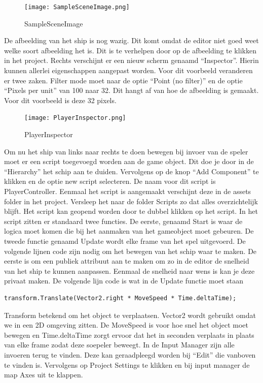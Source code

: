 \begin{figure}[H]
    \centering
    \texttt{[image: SampleSceneImage.png]}
    \caption{SampleSceneImage}
    \label{fig:SampleSceneImage}
\end{figure}

De afbeelding van het ship is nog wazig. Dit komt omdat de editor niet goed weet welke soort afbeelding het is. Dit is te verhelpen door op de afbeelding te klikken in het project. Rechts verschijnt er een nieuw scherm genaamd “Inspector”. Hierin kunnen allerlei eigenschappen aangepast worden. Voor dit voorbeeld veranderen er twee zaken. Filter mode moet naar de optie “Point (no filter)” en de optie “Pixels per unit” van 100 naar 32. Dit hangt af van hoe de afbeelding is gemaakt. Voor dit voorbeeld is deze 32 pixels.

\begin{figure}[H]
    \centering
    \texttt{[image: PlayerInspector.png]}
    \caption{PlayerInspector}
    \label{fig:PlayerInspector}
\end{figure}

Om nu het ship van links naar rechts te doen bewegen bij invoer van de speler moet er een script toegevoegd worden aan de game object. Dit doe je door in de “Hierarchy” het schip aan te duiden. Vervolgens op de knop “Add Component” te klikken en de optie new script selecteren. De naam voor dit script is PlayerController. Eenmaal het script is aangemaakt verschijnt deze in de assets folder in het project. Versleep het naar de folder Scripts zo dat alles overzichtelijk blijft. Het script kan geopend worden door te dubbel klikken op het script.  
In het script zitten er standaard twee functies. De eerste, genaamd Start is waar de logica moet komen die bij het aanmaken van het gameobject moet gebeuren. De tweede functie genaamd Update wordt elke frame van het spel uitgevoerd. De volgende lijnen code zijn nodig om het bewegen van het schip waar te maken. De eerste is om een publiek attribuut aan te maken om zo in de editor de snelheid van het ship te kunnen aanpassen. Eenmaal de snelheid naar wens is kan je deze privaat maken. De volgende lijn code is wat in de Update functie moet staan

\begin{lstlisting}[style=csharp]
    transform.Translate(Vector2.right * MoveSpeed * Time.deltaTime);
\end{lstlisting}

Transform betekend om het object te verplaatsen. Vector2 wordt gebruikt omdat we in een 2D omgeving zitten. De MoveSpeed is voor hoe snel het object moet bewegen en Time.deltaTime zorgt ervoor dat het in seconden verplaats in plaats van elke frame zodat deze soepeler beweegt. In de Input Manager zijn alle invoeren terug te vinden. Deze kan geraadpleegd worden bij “Edit” die vanboven te vinden is. Vervolgens op Project Settings te klikken en bij input manager de map Axes uit te klappen.

